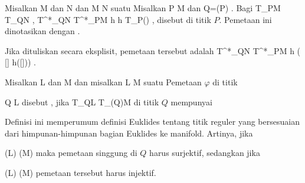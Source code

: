 {}
{

Misalkan
\mathkor {} {M} {dan} {N} {}
dan
\maabbdisp {\varphi} { M } { N
} {}
suatu
Misalkan
\mathkor {} {P \in M} {dan} {Q=\varphi(P)} {.}
Bagi
 { T_PM } { T_QN
} {}
,
\maabbeledisp {} { T^*_QN } { T^*_PM
} { h } { h \circ  T_P(\varphi)
} {,}
disebut  di titik $P$. Pemetaan ini dinotasikan dengan
.

}

Jika dituliskan secara eksplisit, pemetaan tersebut adalah
\maabbeledisp {} {T^*_QN} {T^*_PM
} {h} {( [\gamma] \mapsto h([\varphi \circ \gamma]))
} {.}

{}
{

Misalkan
\mathkor {} {L} {dan} {M} {}
dan misalkan
\maabbdisp {\varphi} { L } { M
} {}
suatu
Pemetaan $\varphi$ di titik

\mavergleichskette
{\vergleichskette
{ Q
}
{ \in }{ L
}
{  }{
}
{    }{
}
{   }{
}
}
{}{}{}
disebut
 {} {,}
jika
 { T_QL } { T_{\varphi(Q)}M
} {}
di titik $Q$ mempunyai

}

Definisi ini memperumum
definisi Euklides tentang titik reguler
yang bersesuaian dari himpunan-himpunan bagian Euklides ke manifold. Artinya, jika

\mavergleichskette
{\vergleichskette
{  (L)
}
{ \geq }{   (M)
}
{  }{
}
{    }{
}
{   }{
}
}
{}{}{}
maka pemetaan singgung di $Q$ harus surjektif, sedangkan jika

\mavergleichskette
{\vergleichskette
{  (L)
}
{ \leq }{   (M)
}
{  }{
}
{    }{
}
{   }{
}
}
{}{}{}
pemetaan tersebut harus injektif.
